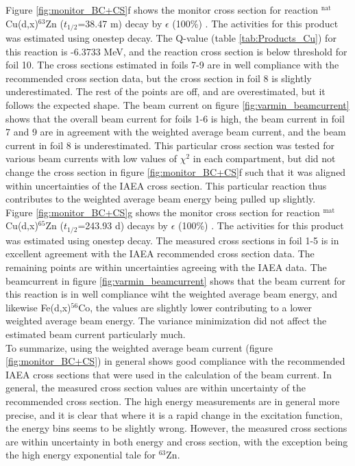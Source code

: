 \documentclass[a4paper,11pt,twoside]{book}
\begin{document}
\noindent 
Figure \ref{fig:monitor_BC+CS}f shows the monitor cross section for reaction $^\text{nat}$Cu(d,x)$^{63}$Zn ($t_{1/2}$=38.47 m) decay by $\epsilon$ (100\%) \cite{ERJUN2001}. The activities for this product was estimated using onestep decay. The Q-value (table \ref{tab:Products_Cu}) for this reaction is -6.3733 MeV, and the reaction cross section is below threshold for foil 10. The cross sections estimated in foils 7-9 are in well compliance with the recommended cross section data, but the cross section in foil 8 is slightly underestimated. The rest of the points are off, and are overestimated, but it follows the expected shape. The beam current on figure \ref{fig:varmin_beamcurrent} shows that the overall beam current for foils 1-6 is high, the beam current in foil 7 and 9 are in agreement with the weighted average beam current, and the beam current in foil 8 is underestimated. This particular cross section was tested for various beam currents with low values of $\chi^2$ in each compartment, but did not change the cross section in figure \ref{fig:monitor_BC+CS}f such that it was aligned within uncertainties of the IAEA cross section. This particular reaction thus contributes to the weighted average beam energy being pulled up slightly. \\

\newline 
Figure \ref{fig:monitor_BC+CS}g shows the monitor cross section for reaction $^\text{mat}$Cu(d,x)$^{65}$Zn ($t_{1/2}$=243.93 d) decays by $\epsilon$ (100\%) \cite{Browne2010}. The activities for this product was estimated using onestep decay. The measured cross sections in foil 1-5 is in excellent agreement with the IAEA recommended cross section data. The remaining points are within uncertainties agreeing with the IAEA data. The beamcurrent in figure \ref{fig:varmin_beamcurrent} shows that the beam current for this reaction is in well compliance wiht the weighted average beam energy, and likewise Fe(d,x)$^{56}$Co, the values are slightly lower contributing to a lower weighted average beam energy. The variance minimization did not affect the estimated beam current particularly much.  \\

\noindent 
To summarize, using the weighted average beam current (figure \ref{fig:monitor_BC+CS}) in general shows good compliance with the recommended IAEA cross sections that were used in the calculation of the beam current. In general, the measured cross section values are within uncertainty of the recommended cross section. The high energy measurements are in general more precise, and it is clear that where it is a rapid change in the excitation function, the energy bins seems to be slightly wrong. However, the measured cross sections are within uncertainty in both energy and cross section, with the exception being the high energy exponential tale for $^{63}$Zn. 
\end{document}
